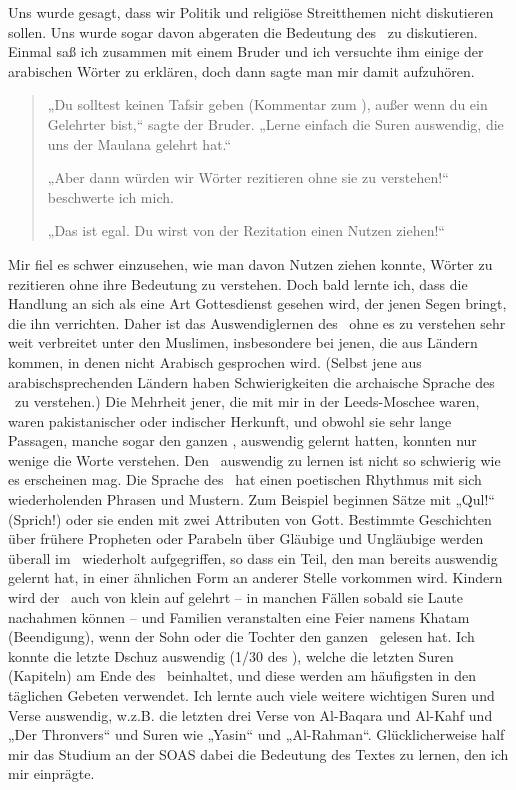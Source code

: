 \documentclass[12pt]{memoir}
\begin{document}
Uns wurde gesagt, dass wir Politik und religiöse Streitthemen
nicht diskutieren sollen.
Uns wurde sogar davon abgeraten die Bedeutung des \Quran\ zu diskutieren.
Einmal saß ich zusammen mit einem Bruder und ich versuchte ihm einige
der arabischen Wörter zu erklären, doch dann sagte man mir damit aufzuhören.

\begin{quote}
„Du solltest keinen Tafsir geben (Kommentar zum \Quran),
außer wenn du ein Gelehrter bist,“ sagte der Bruder.
„Lerne einfach die Suren auswendig, die uns der Maulana gelehrt hat.“

„Aber dann würden wir Wörter rezitieren ohne sie zu verstehen!“
beschwerte ich mich.

„Das ist egal. Du wirst von der Rezitation einen Nutzen ziehen!“
\end{quote}

Mir fiel es schwer einzusehen, wie man davon Nutzen ziehen konnte,
Wörter zu rezitieren ohne ihre Bedeutung zu verstehen.
Doch bald lernte ich, dass die Handlung an sich
als eine Art Gottesdienst gesehen wird,
der jenen Segen bringt, die ihn verrichten.
Daher ist das Auswendiglernen des \Quran\ ohne es zu verstehen
sehr weit verbreitet unter den Muslimen, insbesondere bei jenen,
die aus Ländern kommen, in denen nicht Arabisch gesprochen wird.
(Selbst jene aus arabischsprechenden Ländern haben Schwierigkeiten
die archaische Sprache des \Quran\ zu verstehen.)
Die Mehrheit jener, die mit mir in der Leeds-Moschee waren,
waren pakistanischer oder indischer Herkunft,
und obwohl sie sehr lange Passagen, manche sogar den ganzen \Quran,
auswendig gelernt hatten, konnten nur wenige die Worte verstehen.
Den \Quran\ auswendig zu lernen ist nicht so schwierig wie es erscheinen mag.
Die Sprache des \Quran\ hat einen poetischen Rhythmus
mit sich wiederholenden Phrasen und Mustern.
Zum Beispiel beginnen Sätze mit „Qul!“ (Sprich!)
oder sie enden mit zwei Attributen von Gott.
Bestimmte Geschichten über frühere Propheten oder Parabeln
über Gläubige und Ungläubige werden überall im \Quran\ wiederholt aufgegriffen,
so dass ein Teil, den man  bereits auswendig gelernt hat,
in einer ähnlichen Form an anderer Stelle vorkommen wird.
Kindern wird der \Quran\ auch von klein auf gelehrt –
in manchen Fällen sobald sie Laute nachahmen können –
und Familien veranstalten eine Feier namens Khatam (Beendigung),
wenn der Sohn oder die Tochter den ganzen \Quran\ gelesen hat.
Ich konnte die letzte Dschuz\´ auswendig (1/30 des \Quran),
welche die letzten Suren (Kapiteln) am Ende des \Quran\ beinhaltet,
und diese werden am häufigsten in den täglichen Gebeten verwendet.
Ich lernte auch viele weitere wichtigen Suren und Verse auswendig,
w.z.B. die letzten drei Verse von Al-Baqara und Al-Kahf und „Der Thronvers“
und Suren wie „Yasin“ und „Al-Rahman“.
Glücklicherweise half mir das Studium an der SOAS dabei
die Bedeutung des Textes zu lernen, den ich mir einprägte.
\end{document}
